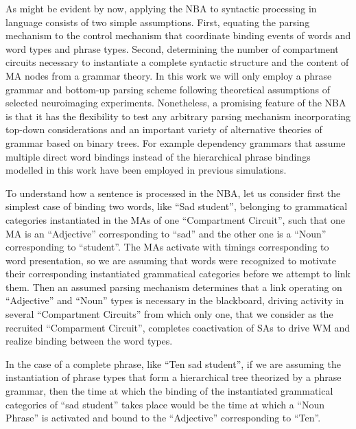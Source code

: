 \documentclass[10pt]{article}
\begin{document}
As might be evident by now, applying the NBA to syntactic processing in language consists of two simple assumptions.
First, equating the parsing mechanism to the control mechanism that coordinate binding events of words and word types and phrase types.
Second, determining the number of compartment circuits necessary to instantiate a complete syntactic structure and the content of MA nodes from a grammar theory.
In this work we will only employ a phrase grammar and bottom-up parsing scheme following theoretical assumptions of selected neuroimaging experiments.
Nonetheless, a promising feature of the NBA is that it has the flexibility to test any arbitrary parsing mechanism incorporating top-down considerations and an important variety of alternative theories of grammar based on binary trees.
For example dependency grammars that assume multiple direct word bindings instead of the hierarchical phrase bindings modelled in this work have been employed in previous simulations\cite{van_der_Velde_2010}.

To understand how a sentence is processed in the NBA, let us consider first the simplest case of binding two words, like ``Sad student'', belonging to grammatical categories instantiated in the MAs of one ``Compartment Circuit'', such that one MA is an ``Adjective'' corresponding to ``sad'' and the other one is a ``Noun'' corresponding to ``student''.
The MAs activate with timings corresponding to word presentation, so we are assuming that words were recognized to motivate their corresponding instantiated grammatical 
categories before we attempt to link them.
Then an assumed parsing mechanism determines that a link operating on ``Adjective'' and ``Noun'' types is necessary in the blackboard, driving activity in several ``Compartment Circuits'' from which only one, that we consider as the recruited ``Comparment Circuit'', completes coactivation of SAs to drive WM and realize binding between the word types.

In the case of a complete phrase, like ``Ten sad student'', if we are assuming the instantiation of phrase types that form a hierarchical tree theorized by a phrase grammar, then the time at which the binding of the instantiated grammatical categories of ``sad student'' takes place would be the time at which a ``Noun Phrase'' is activated and bound to the ``Adjective'' corresponding to ``Ten''.
\end{document}
